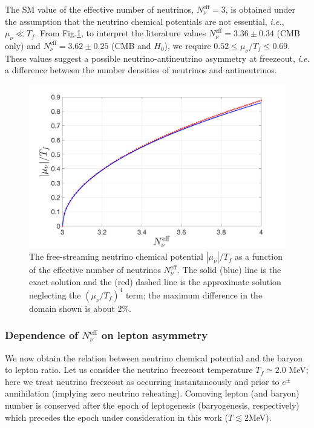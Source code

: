 The SM value of the effective number of neutrinos, $N_\nu^{\mathrm{eff}}=3$, is obtained under the assumption that the neutrino chemical potentials are not essential, {\it i.e.\/}, $\mu_\nu\ll T_f$. From Fig.\;\ref{Chemical_Potential_Neff}, to interpret the literature values $N_\nu^{\mathrm{eff}}=3.36\pm0.34$ (CMB only) and $N_\nu^{\mathrm{eff}}= 3.62\pm0.25$ (CMB and $H_0$), we require $0.52\leqslant\mu_\nu/T_f\leqslant0.69$. These values suggest  a possible neutrino-antineutrino asymmetry at freezeout, {\it i.e.\/} a difference between the number densities of neutrinos and antineutrinos.
\begin{figure}[t]
\begin{center}
\includegraphics[width=\textwidth]{./plots/Chemical_Potential_Neff}
\caption{The free-streaming neutrino chemical potential $|\mu_\nu|/T_f$ as a function of the effective number of neutrinos $N_\nu^{\mathrm{eff}}$. The solid (blue) line is the exact solution and the (red) dashed line is the approximate solution neglecting the $(\mu_\nu/T_f)^4$ term; the maximum difference in the domain shown is about $2\%$.}
\label{Chemical_Potential_Neff}
\end{center}
\end{figure}



\subsubsection{Dependence of $N_\nu^{\mathrm{eff}}$ on lepton asymmetry}
We now obtain the relation between neutrino chemical potential and the baryon to lepton ratio. Let us consider the neutrino freezeout temperature $T_f\simeq 2.0$ MeV; here we treat neutrino freezeout as occurring instantaneously and prior to $e^\pm$ annihilation (implying zero neutrino reheating). Comoving lepton (and baryon) number is conserved after the epoch of leptogenesis (baryogenesis, respectively) which precedes the epoch  under consideration in this work ($T\lesssim 2$\;MeV). %

